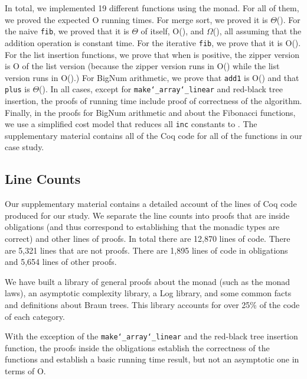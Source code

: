 \documentclass{llncs}
\newcommand{\Scribtexttt}[1]{{\texttt{#1}}}
\let\SOriginalthesubsubsection\thesubsubsection
\newcommand{\Ssubsection}[2]{\subsection[#1]{#2}\let\thesubsubsection\SOriginalthesubsubsection}
\begin{document}
In total, we implemented 19 different functions using the
monad.  For all of them, we proved the expected O running times.  For
merge sort, we proved it is $\Theta$(). For the naive
\Scribtexttt{fib}, we proved that it is $\Theta$ of itself, O(), and
$\Omega$(), all assuming that the addition operation is
constant time. For the iterative \Scribtexttt{fib}, we prove that it is
O().  For the list insertion functions, we prove that
when  is positive, the zipper version is O of the list
version (because the zipper version runs in O()
while the list version runs in O().) For BigNum
arithmetic, we prove that \Scribtexttt{add1} is O() and
that \Scribtexttt{plus} is $\Theta$(). In all cases, except for
\Scribtexttt{make{\char`\_}array{\char`\_}linear} and red{-}black tree insertion, the proofs of
running time include proof of correctness of the algorithm. Finally,
in the proofs for BigNum arithmetic and about the Fibonacci functions,
we use a simplified cost model that reduces all \Scribtexttt{inc} constants to
.  The supplementary material contains all of the Coq
code for all of the functions in our case study.

\Ssubsection{Line Counts}{Line Counts}\label{t:x28part_x22Linex5fCountsx22x29}

Our supplementary material contains a detailed account of the
lines of Coq code produced for our study. We separate the line counts
into proofs that are inside obligations (and thus correspond to
establishing that the monadic types are correct) and other lines of
proofs. In total there are 12,870 lines of code. There
are 5,321 lines that are not proofs. There are
1,895 lines of code in obligations and
5,654 lines of other proofs.

We have built a library of general proofs about the monad (such as
the monad laws), an asymptotic complexity library, a Log library, and
some common facts and definitions about Braun trees. This library
accounts for over 25\% of the code of each category.

With the exception of the \Scribtexttt{make{\char`\_}array{\char`\_}linear} and the red{-}black
tree insertion function, the proofs inside the obligations establish
the correctness of the functions and establish a basic running time
result, but not an asymptotic one in terms of O.
\end{document}
